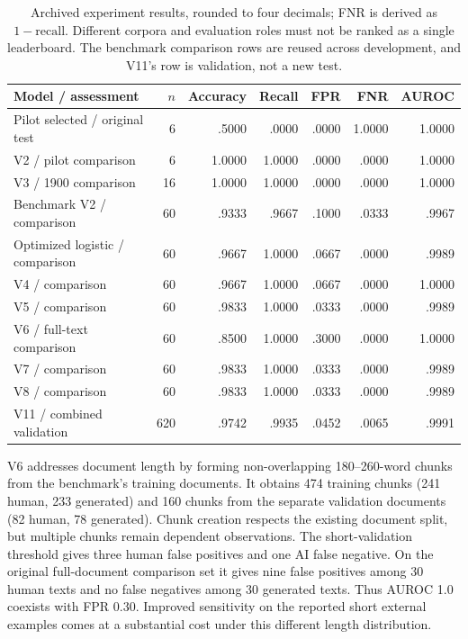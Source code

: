 \documentclass[11pt]{article}
\begin{document}
\begin{table}[htbp]
\centering\small
\begin{tabular}{lrrrrrr}
\toprule
Model / assessment & $n$ & Accuracy & Recall & FPR & FNR & AUROC \\
\midrule
Pilot selected / original test & 6 & .5000 & .0000 & .0000 & 1.0000 & 1.0000 \\
V2 / pilot comparison & 6 & 1.0000 & 1.0000 & .0000 & .0000 & 1.0000 \\
V3 / 1900 comparison & 16 & 1.0000 & 1.0000 & .0000 & .0000 & 1.0000 \\
Benchmark V2 / comparison & 60 & .9333 & .9667 & .1000 & .0333 & .9967 \\
Optimized logistic / comparison & 60 & .9667 & 1.0000 & .0667 & .0000 & .9989 \\
V4 / comparison & 60 & .9667 & 1.0000 & .0667 & .0000 & 1.0000 \\
V5 / comparison & 60 & .9833 & 1.0000 & .0333 & .0000 & .9989 \\
V6 / full-text comparison & 60 & .8500 & 1.0000 & .3000 & .0000 & 1.0000 \\
V7 / comparison & 60 & .9833 & 1.0000 & .0333 & .0000 & .9989 \\
V8 / comparison & 60 & .9833 & 1.0000 & .0333 & .0000 & .9989 \\
V11 / combined validation & 620 & .9742 & .9935 & .0452 & .0065 & .9991 \\
\bottomrule
\end{tabular}
\caption{Archived experiment results, rounded to four decimals; FNR is
derived as $1-\mathrm{recall}$. Different corpora and evaluation roles must
not be ranked as a single leaderboard. The benchmark comparison rows are
reused across development, and V11's row is validation, not a new test.}
\label{tab:evolution}
\end{table}

V6 addresses document length by forming non-overlapping 180--260-word chunks
from the benchmark's training documents. It obtains 474 training chunks
(241 human, 233 generated) and 160 chunks from the separate validation
documents (82 human, 78 generated). Chunk creation respects the existing
document split, but multiple chunks remain dependent observations. The
short-validation threshold gives three human false positives and one AI
false negative. On the original full-document comparison set it gives nine
false positives among 30 human texts and no false negatives among 30 generated
texts. Thus AUROC 1.0 coexists with FPR 0.30. Improved sensitivity on the
reported short external examples comes at a substantial cost under this
different length distribution.
\end{document}
